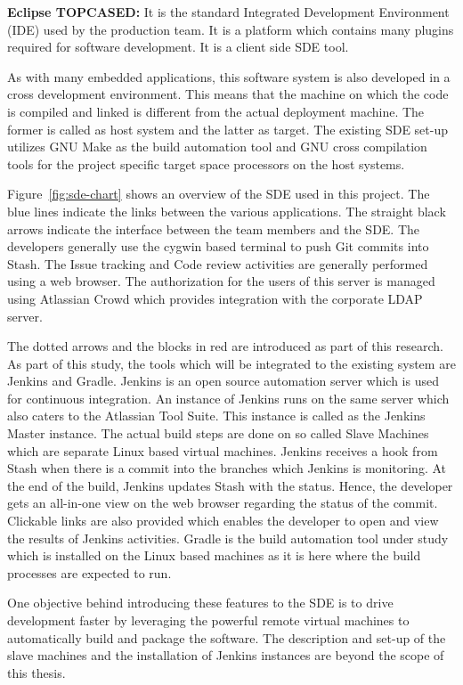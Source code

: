 \documentclass[12pt, a4paper, titlepage]{scrartcl}
\begin{document}
\textbf{Eclipse TOPCASED:} It is the standard Integrated Development Environment (IDE) used by the production team. It is a platform which contains many plugins required for software development. It is a client side SDE tool.
\par As with many embedded applications, this software system is also developed in a cross development environment\cite{rtemsIntro}. This means that the machine on which the code is compiled and linked is different from the actual deployment machine. The former is called as host system and the latter as target. The existing SDE set-up utilizes GNU Make\cite{GNUMakeManual} as the build automation tool and GNU cross compilation tools for the project specific target space processors on the host systems. 
\par Figure~\ref{fig:sde-chart} shows an overview of the SDE used in this project. The blue lines indicate the links between the various applications. The straight black arrows indicate the interface between the team members and the SDE. The developers generally use the cygwin based terminal to push Git commits into Stash. The Issue tracking and Code review activities are generally performed using a web browser. The authorization for the users of this server is managed using Atlassian Crowd which provides integration with the corporate LDAP server.
\par The dotted arrows and the blocks in red are introduced as part of this research. As part of this study, the tools which will be integrated to the existing system are Jenkins and Gradle. Jenkins is an open source automation server which is used for continuous integration. An instance of Jenkins runs on the same server which also caters to the Atlassian Tool Suite. This instance is called as the Jenkins Master instance. The actual build steps are done on so called Slave Machines which are separate Linux based virtual machines. Jenkins receives a hook from Stash when there is a commit into the branches which Jenkins is monitoring. At the end of the build, Jenkins updates Stash with the status. Hence, the developer gets an all-in-one view on the web browser regarding the status of the commit. Clickable links are also provided which enables the developer to open and view the results of Jenkins activities. Gradle is the build automation tool under study which is installed on the Linux based machines as it is here where the build processes are expected to run.
\par One objective behind introducing these features to the SDE is to drive development faster by leveraging the powerful remote virtual machines to automatically build and package the software. The description and set-up of the slave machines and the installation of Jenkins instances are beyond the scope of this thesis. 
\end{document}
